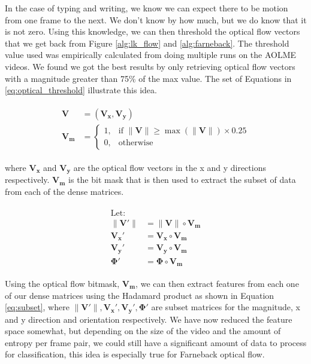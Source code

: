 In the case of typing and writing, we know we can expect there to be motion from
one frame to the next. We don't know by how much, but we do know that it is not
zero. Using this knowledge, we can then threshold the optical flow vectors that
we get back from Figure \ref{alg:lk_flow} and \ref{alg:farneback}. The
threshold value used was empirically calculated from doing multiple runs on the
AOLME videos. We found we got the best results by only retrieving
optical flow vectors with a magnitude greater than 75\% of the max value. The set
of Equations in \ref{eq:optical_threshold} illustrate this idea.

\begin{align}
  \begin{split}
  \mathbf{V} &= (\mathbf{V_x}, \mathbf{V_y}) \\
  \mathbf{V_m} &=
  \begin{cases}
    1, & \text{if } \|\mathbf{V}\| \geq \max( \|\mathbf{V}\|) \times 0.25 \\
    0, & \text{otherwise}
  \end{cases}
  \end{split}
  \label{eq:optical_threshold}
\end{align}

where $\mathbf{V_x}$ and $\mathbf{V_y}$ are the optical flow vectors in the
x and y directions respectively. $\mathbf{V_m}$ is the bit mask that is
then used to extract the subset of data from each of the dense matrices.

\begin{align}
  \begin{split}
  \text{Let: } \\
  \|\mathbf{V\prime}\| &= \|\mathbf{V}\| \circ \mathbf{V_m}\\
  \mathbf{V_x\prime} &= \mathbf{V_x} \circ \mathbf{V_m}\\
  \mathbf{V_y\prime} &= \mathbf{V_y} \circ \mathbf{V_m}\\
  \mathbf{\Phi\prime} &= \mathbf{\Phi} \circ \mathbf{V_m}
\end{split}
\label{eq:subset}
\end{align}

Using the optical flow bitmask, $\mathbf{V_m}$, we can then extract features
from each one of our dense matrices using the Hadamard product as shown in
Equation \ref{eq:subset}, where $\|\mathbf{V\prime}\|,
\mathbf{V_x\prime},\mathbf{V_y\prime}, \mathbf{\Phi\prime}$ are subset matrices
for the magnitude, x and y direction and orientation respectively. We have now
reduced the feature space somewhat, but depending on the size of the video and the
amount of entropy per frame pair, we could still have a significant amount of
data to process for classification, this idea is especially true for
Farneback optical flow.

